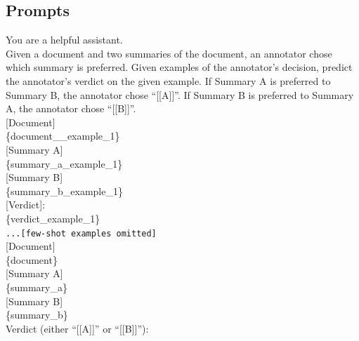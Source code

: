 \subsection{Prompts}
\begin{tcolorbox}[colback=white,colframe=black!75!white,colbacktitle=black!75!white,title=Prompt for Summarization Evaluation]
  You are a helpful assistant.\\

  Given a document and two summaries of the document, an annotator chose which summary is preferred. Given examples of the annotator's decision, predict the annotator's verdict on the given example. If Summary A is preferred to Summary B, the annotator chose ``[[A]]''. If Summary B is preferred to Summary A, the annotator chose ``[[B]]''.\\

  [Document]\\
  \{document\_\_example\_1\}\\

  [Summary A]\\
  \{summary\_a\_example\_1\}\\

  [Summary B]\\
  \{summary\_b\_example\_1\}\\

  [Verdict]:\\
  \{verdict\_example\_1\}\\

  \texttt{...[few-shot examples omitted]}\\

  [Document]\\
  \{document\}\\

  [Summary A]\\
  \{summary\_a\}\\

  [Summary B]\\
  \{summary\_b\}\\

  Verdict (either ``[[A]]'' or ``[[B]]''):
\end{tcolorbox}
\newpage
